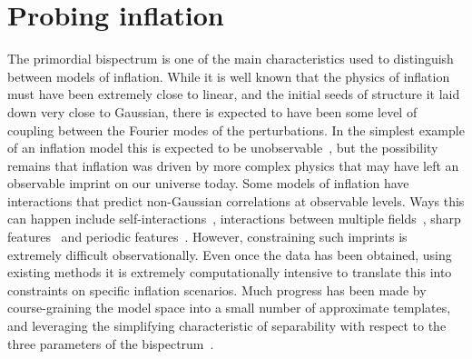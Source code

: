 %
\chapter{Probing inflation}\label{chapter:intro_bispectra}
The primordial bispectrum is one of the main
characteristics used to distinguish between models of inflation. While it is well
known that the physics of inflation must have been extremely close
to linear, and the initial seeds of structure it laid down
very close to Gaussian, there is expected to have been some level of coupling
between the Fourier modes of the perturbations.
In the simplest example of an inflation model this is
expected to be unobservable~\cite{Maldacena},
but the possibility remains that inflation was driven by
more complex physics that may have left an observable imprint on our universe today.
Some models of inflation have interactions that predict non-Gaussian
correlations at observable levels. Ways this can happen include
self-interactions~\cite{px_burrage,dbi_in_the_sky},
interactions between multiple fields~\cite{Byrnes_2010},
sharp features~\cite{adshead}
and periodic features~\cite{flauger_pajer_resonant}.
However, constraining such imprints is extremely difficult observationally.
Even once the data has been obtained, using existing methods it is
extremely computationally intensive to translate this into constraints
on specific inflation scenarios. Much progress has been made by course-graining
the model space into a small number of approximate templates,
and leveraging the simplifying characteristic of separability
with respect to the three parameters of the bispectrum~\cite{Komatsu_2005, Munchmeyer_2014}.


